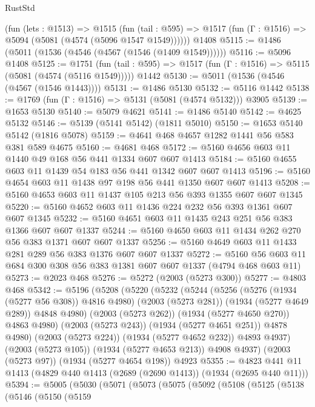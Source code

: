 \begin{lexlean}{RustStd}
\begin{coremodule}
    (fun (lets : @1513) =>
    @1515
      (fun (tail : @595) => @1517 (fun (Γ : @1516) => @5094 (@5081 (@4574 (@5096 @1547 @1549))))))
    @1408
@5115 := @1486 (@5011 (@1536 (@4546 (@4567 (@1546 (@1409 @1549))))))
@5116 := @5096 @1408
@5125 := @1751
    (fun (tail : @595) => @1517 (fun (Γ : @1516) => @5115 (@5081 (@4574 (@5116 @1549)))))
    @1442
@5130 := @5011 (@1536 (@4546 (@4567 (@1546 @1443))))
@5131 := @1486 @5130
@5132 := @5116 @1442
@5138 := @1769 (fun (Γ : @1516) => @5131 (@5081 (@4574 @5132))) @3905
@5139 := @1653 @5130
@5140 := @5079 @4621
@5141 := @1486 @5140
@5142 := @4625 @5132
@5146 := @5139 (@5141 @5142) (@1811 @5010)
@5150 := @1653 @5140 @5142 (@1816 @5078)
@5159 := @4641 @468 @4657 @1282 @1441 @56 @583 @381 @589 @4675
@5160 := @4681 @468
@5172 := @5160 @4656 @603 @11 @1440 @49 @168 @56 @441 @1334 @607 @607 @1413
@5184 := @5160 @4655 @603 @11 @1439 @54 @183 @56 @441 @1342 @607 @607 @1413
@5196 := @5160 @4654 @603 @11 @1438 @97 @198 @56 @441 @1350 @607 @607 @1413
@5208 := @5160 @4653 @603 @11 @1437 @105 @213 @56 @393 @1355 @607 @607 @1345
@5220 := @5160 @4652 @603 @11 @1436 @224 @232 @56 @393 @1361 @607 @607 @1345
@5232 := @5160 @4651 @603 @11 @1435 @243 @251 @56 @383 @1366 @607 @607 @1337
@5244 := @5160 @4650 @603 @11 @1434 @262 @270 @56 @383 @1371 @607 @607 @1337
@5256 := @5160 @4649 @603 @11 @1433 @281 @289 @56 @383 @1376 @607 @607 @1337
@5272 := @5160 @56 @603 @11 @684 @300 @308 @56 @383 @1381 @607 @607 @1337 (@4794 @468 @603 @11)
@5273 := @2023 @468
@5276 := @5272 (@2003 (@5273 @300))
@5277 := @4803 @468
@5342 := @5196
    (@5208
      (@5220
        (@5232
          (@5244
            (@5256
              (@5276 (@1934 (@5277 @56 @308)) @4816 @4980)
              (@2003 (@5273 @281))
              (@1934 (@5277 @4649 @289))
              @4848
              @4980)
            (@2003 (@5273 @262))
            (@1934 (@5277 @4650 @270))
            @4863
            @4980)
          (@2003 (@5273 @243))
          (@1934 (@5277 @4651 @251))
          @4878
          @4980)
        (@2003 (@5273 @224))
        (@1934 (@5277 @4652 @232))
        @4893
        @4937)
      (@2003 (@5273 @105))
      (@1934 (@5277 @4653 @213))
      @4908
      @4937)
    (@2003 (@5273 @97))
    (@1934 (@5277 @4654 @198))
    @4923
@5355 := @4823 @441 @11 @1413 (@4829 @440 @1413 (@2689 (@2690 @1413)) (@1934 (@2695 @440 @11)))
@5394 := @5005
    (@5030
      (@5071
        (@5073
          (@5075
            (@5092
              (@5108
                (@5125
                  (@5138
                    (@5146
                      (@5150
                        (@5159

\end{coremodule}
\end{lexlean}
